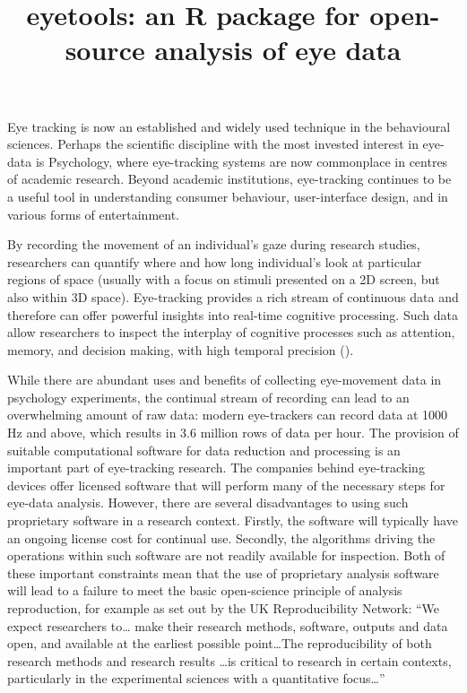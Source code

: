 \documentclass[
  man,
  floatsintext,
  longtable,
  nolmodern,
  notxfonts,
  notimes,
  colorlinks=true,linkcolor=blue,citecolor=blue,urlcolor=blue]{apa7}
\title{eyetools: an R package for open-source analysis of eye data}
\affiliation{
{Lancaster University}}
\begin{document}
\maketitle


\setcounter{secnumdepth}{-\maxdimen} %

\setlength\LTleft{0pt}

\resetlinenumber[1]

Eye tracking is now an established and widely used technique in the
behavioural sciences. Perhaps the scientific discipline with the most
invested interest in eye-data is Psychology, where eye-tracking systems
are now commonplace in centres of academic research. Beyond academic
institutions, eye-tracking continues to be a useful tool in
understanding consumer behaviour, user-interface design, and in various
forms of entertainment.

By recording the movement of an individual's gaze during research
studies, researchers can quantify where and how long individual's look
at particular regions of space (usually with a focus on stimuli
presented on a 2D screen, but also within 3D space). Eye-tracking
provides a rich stream of continuous data and therefore can offer
powerful insights into real-time cognitive processing. Such data allow
researchers to inspect the interplay of cognitive processes such as
attention, memory, and decision making, with high temporal precision
().

While there are abundant uses and benefits of collecting eye-movement
data in psychology experiments, the continual stream of recording can
lead to an overwhelming amount of raw data: modern eye-trackers can
record data at 1000 Hz and above, which results in 3.6 million rows of
data per hour. The provision of suitable computational software for data
reduction and processing is an important part of eye-tracking research.
The companies behind eye-tracking devices offer licensed software that
will perform many of the necessary steps for eye-data analysis. However,
there are several disadvantages to using such proprietary software in a
research context. Firstly, the software will typically have an ongoing
license cost for continual use. Secondly, the algorithms driving the
operations within such software are not readily available for
inspection. Both of these important constraints mean that the use of
proprietary analysis software will lead to a failure to meet the basic
open-science principle of analysis reproduction, for example as set out
by the UK Reproducibility Network: ``We expect researchers to\ldots{}
make their research methods, software, outputs and data open, and
available at the earliest possible point\ldots The reproducibility of
both research methods and research results \ldots is critical to
research in certain contexts, particularly in the experimental sciences
with a quantitative focus\ldots{}''
\end{document}
